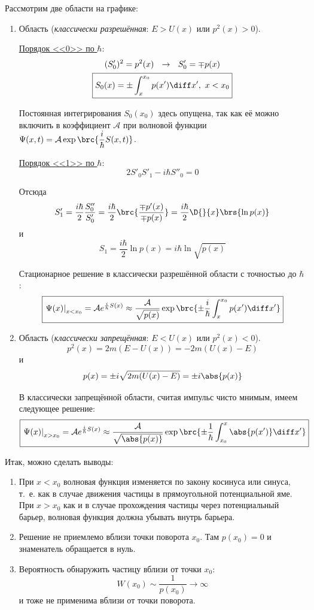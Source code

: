 Рассмотрим две области на графике:
\renewcommand{\labelenumi}{(\alph{enumi})}
\begin{enumerate}
\item Область  ({\em классически разрешённая}: $E > U(x)$ или $p^2(x)>0$).

\underline{Порядок <<0>> по $\hbar$}:
$$
\begin{gathered}
(S'_0)^2 = p^2(x) ~~ \rightarrow~~ S'_0 = \mp p(x)\\
\boxed{S_0(x) = \pm \int_x^{x_0} p(x')\diff x',~ x<x_0}
\end{gathered}
$$

Постоянная интегрирования $S_0(x_0)$ здесь опущена, так как её можно включить в коэффициент $\mathcal{A}$ при волновой функции ${\Psi(x, t) = \mathcal{A} \exp \brc{\dfrac{i}{\hbar} S(x, t)}}$.

\underline{Порядок <<1>> по $\hbar$}:
$$
2 S'_0 S'_1 - i\hbar S''_0 = 0
$$

Отсюда
$$
S'_1 = \frac{i\hbar}{2} \frac{S''_0}{S'_0} = \frac{i\hbar}{2} \brc{\frac{\mp p'(x)}{\mp p(x)}} = \frac{i\hbar}{2} \D{}{x}\brs{\ln p(x)}
$$
и
$$
S_1 = \frac{i\hbar}{2} \ln p(x) = \boxed{i\hbar \ln \sqrt{p(x)}}
$$

Стационарное решение в классически разрешённой области с точностью до $\hbar$:
$$
\boxed{\left. \Psi(x) \right|_{x<x_0} = \mathcal{A} e^{\frac{i}{h} S(x)} \approx \frac{\mathcal{A}}{\sqrt{p(x)}} \exp \brc{\pm\frac{i}{\hbar}\int_x^{x_0} p(x') \diff x'} }
$$

\item Область  ({\em классически запрещённая}: $E<U(x)$ или $p^2(x)<0$).
$$
p^2(x) = 2m(E-U(x)) = -2m(U(x)-E)
$$
и
$$
p(x) = \pm i \sqrt{2m(U(x)-E)} = \pm i \abs{p(x)}
$$

В классически запрещённой области, считая импульс чисто мнимым, имеем следующее решение:
$$
\boxed{\left. \Psi(x) \right|_{x>x_0} = \mathcal{A} e^{\frac{i}{\hbar} S(x)} \approx \frac{\mathcal{A}}{\sqrt{\abs{p(x)}}} \exp \brc{\pm\frac{1}{\hbar}\int_{x_0}^{x} \abs{p(x')} \diff x'} }
$$
\end{enumerate}

Итак, можно сделать выводы:
\renewcommand{\labelenumi}{\arabic{enumi})}
\begin{enumerate}
\item При $x<x_0$ волновая функция изменяется по закону косинуса или синуса, т.~е. как в случае движения частицы в прямоугольной потенциальной яме. При $x>x_0$ как и в случае прохождения частицы через потенциальный барьер, волновая функция должна убывать внутрь барьера.
\item Решение не приемлемо вблизи точки поворота $x_0$. Там $p(x_0) = 0$ и знаменатель обращается в нуль.
\item Вероятность обнаружить частицу вблизи от точки $x_0$:
$${W(x_0) \sim \dfrac{1}{p(x_0)} \to \infty}$$
и тоже не применима вблизи от точки поворота.
\end{enumerate}

